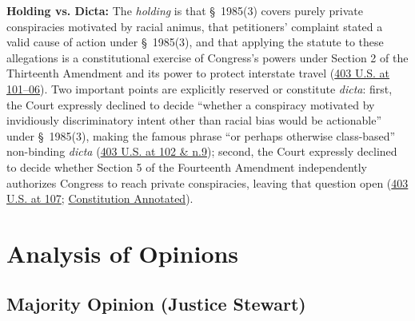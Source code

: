 \documentclass[12pt]{article}
\begin{document}
\textbf{Holding vs. Dicta:} The \textit{holding} is that \S~1985(3) covers purely private conspiracies motivated by racial animus, that petitioners' complaint stated a valid cause of action under \S~1985(3), and that applying the statute to these allegations is a constitutional exercise of Congress's powers under Section 2 of the Thirteenth Amendment and its power to protect interstate travel (\href{https://supreme.justia.com/cases/federal/us/403/88/}{403 U.S. at 101--06}). Two important points are explicitly reserved or constitute \textit{dicta}: first, the Court expressly declined to decide ``whether a conspiracy motivated by invidiously discriminatory intent other than racial bias would be actionable'' under \S~1985(3), making the famous phrase ``or perhaps otherwise class-based'' non-binding \textit{dicta} (\href{https://supreme.justia.com/cases/federal/us/403/88/}{403 U.S. at 102 \& n.9}); second, the Court expressly declined to decide whether Section 5 of the Fourteenth Amendment independently authorizes Congress to reach private conspiracies, leaving that question open (\href{https://supreme.justia.com/cases/federal/us/403/88/}{403 U.S. at 107}; \href{https://constitution.congress.gov/browse/essay/amdt14-S5-2/ALDE_00000851/}{Constitution Annotated}).

\section{Analysis of Opinions}

\subsection{Majority Opinion (Justice Stewart)}
\end{document}
